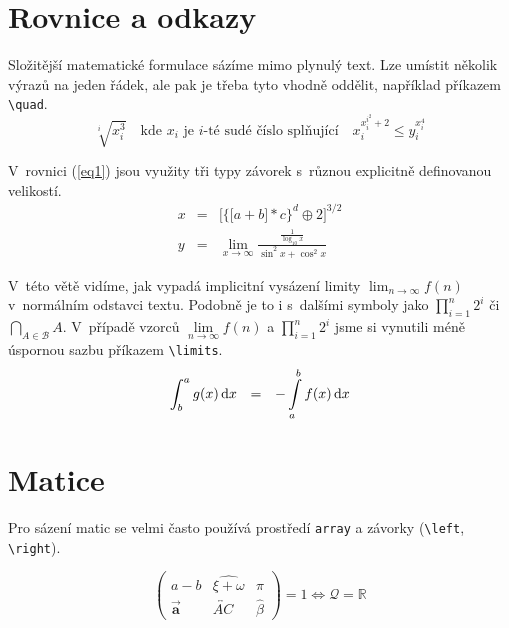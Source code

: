 \documentclass[a4paper, 11pt, twocolumn]{article}
\begin{document}
    \section{Rovnice a odkazy}
    Složitější matematické formulace sázíme mimo plynulý text. Lze umístit
    několik výrazů na jeden řádek, ale pak je třeba tyto vhodně oddělit,
    například příkazem \verb|\quad|.
    \bigskip
    \begin{equation}
        \sqrt[i]{x^3_i} \quad \text{kde } x_i \text{ je } i
        \text{-té sudé číslo splňující} \quad
        x_i^{x_i^{i^2}+2} \leq y_i^{x_i^4}
        \nonumber
    \end{equation}

    V~rovnici (\ref{eq1}) jsou využity tři typy závorek s~různou explicitně definovanou
    velikostí.
    \bigskip
    \begin{eqnarray}
        \label{eq1}
        x & = & \bigg[\Big\{\big[a+b\big]*c\Big\}^d \oplus 2 \bigg]^{3/2} \\
        y & = & \lim_{x\to\infty} \frac{\frac{1}{\log_{10} x}}{\sin^2 x + \cos^2 x}
        \nonumber
    \end{eqnarray}

    V~této větě vidíme, jak vypadá implicitní vysázení limity
    $\lim_{n\to\infty}f(n)$ v~normálním odstavci textu. Podobně je to i
    s~dalšími symboly jako $\prod^n_{i=1}2^i$ či $\bigcap_{A\in\mathcal{B}} A$. V~případě
    vzorců $\lim\limits_{n\to\infty}f(n)$ a $\prod\limits^n_{i=1}2^i$ jsme si
    vynutili méně úspornou sazbu příkazem \verb|\limits|.
    \bigskip
    \begin{equation}
        \int^a_b g(x)\mathrm{\,d}x\hspace{0.7em} =
        \hspace{0.7em} - \int\limits^b_a f(x)\mathrm{\,d}x
    \end{equation}
    \section{Matice}
    Pro sázení matic se velmi často používá prostředí \texttt{array} a závorky
    (\verb|\left|, \verb|\right|).

    \begin{equation}
        \nonumber
        \left(
        \begin{array}{ccc}
            a-b & \widehat{\xi + \omega} & \pi \\
            \vec{\mathbf{a}} & \overleftrightarrow{AC} & \hat{\beta}
        \end{array}
        \right)
        = 1 \Longleftrightarrow \mathcal{Q} = \mathbb{R}
    \end{equation}
\end{document}
